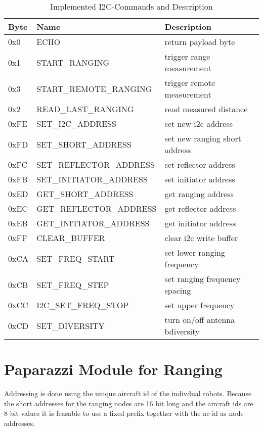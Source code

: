 \begin{table}
	
	\begin{tabularx}{\columnwidth}{l | l | X}
	Byte & Name & Description \\ \hline
	0x0  & ECHO & return payload byte\\
	0x1  & START\_RANGING & trigger range measurement\\
	0x3  & START\_REMOTE\_RANGING & trigger remote measurement\\
	0x2  & READ\_LAST\_RANGING & read measured distance\\
	0xFE & SET\_I2C\_ADDRESS & set new i2c address\\
	0xFD & SET\_SHORT\_ADDRESS & set new ranging short address\\
	0xFC & SET\_REFLECTOR\_ADDRESS & set reflector address\\
	0xFB & SET\_INITIATOR\_ADDRESS & set initiator address\\
	0xED & GET\_SHORT\_ADDRESS & get ranging address\\
	0xEC & GET\_REFLECTOR\_ADDRESS & get reflector address\\
	0xEB & GET\_INITIATOR\_ADDRESS & get initiator address\\
	0xFF & CLEAR\_BUFFER & clear i2c write buffer\\
	0xCA & SET\_FREQ\_START & set lower ranging frequency\\
	0xCB & SET\_FREQ\_STEP & set ranging frequency spacing\\
	0xCC & I2C\_SET\_FREQ\_STOP & set upper frequency\\
	0xCD & SET\_DIVERSITY & turn on/off antenna bdiversity\\
	\end{tabularx}

	\caption{Implemented I2C-Commands and Description}
	
\end{table}


\section{Paparazzi Module for Ranging}


Addressing is done using the unique aircraft id of the indivdual robots.
Because the short addresses for the ranging nodes are 16 bit long and the aircraft ids are 8 bit values it is feasable to use a fixed prefix together with the ac-id as node addresses.

